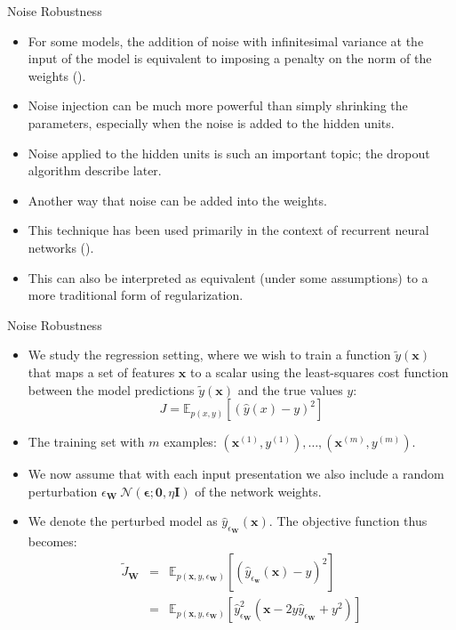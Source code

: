 \documentclass[10pt]{beamer}
\begin{document}
	\begin{frame}{Noise Robustness}
		\begin{itemize}
			\item For some models, the addition of noise with infinitesimal variance at the input of the model is equivalent to imposing a penalty on the norm of the weights (\citet{bishop1995regularization,bishop1995training}).
			\pause
			\item Noise injection can be much more powerful than simply shrinking the parameters, especially when the noise is added to the hidden units.
			\pause
			\item Noise applied to the hidden units is such an important topic; the dropout algorithm describe later.
			\pause
			\item Another way that noise can be added into the weights.
			\pause
			\item This technique has been used primarily in the context of recurrent neural networks (\citet{jim1996analysis,graves2011practical}).
			\pause
			\item This can also be interpreted as equivalent (under some assumptions) to a more traditional form of regularization.
		\end{itemize}
	\end{frame}

	\begin{frame}{Noise Robustness}
		\begin{itemize}
			\item We study the regression setting, where we wish to train a function $\tilde{y}(\bm{x})$ that maps a set of features $\bm{x}$ to a scalar using the least-squares cost function between the model predictions $\tilde{y}(\bm{x})$ and the true values $y$:
			$$J=\mathbb{E}_{p(x,y)}\left[(\hat{y}(x)-y)^2\right]$$
			
			\pause
			\item The training set with $m$ examples: ${(\bm{x}^{(1)},y^{(1)}),\dots,(\bm{x}^{(m)},y^{(m)})}$.
			\pause
			\item We now assume that with each input presentation we also include a random perturbation $\epsilon_{\bm{W}}~\mathcal{N}(\bm{\epsilon};\bm{0},\eta\bm{I})$ of the network weights.
			\pause
			\item We denote the perturbed model as $\hat{y}_{\epsilon_{\bm{W}}}(\bm{x})$. The objective function thus becomes:
			\begin{eqnarray*}
				\tilde{J}_{\bm{W}}&=&\mathbb{E}_{p(\bm{x},y,\epsilon_{\bm{W}})}\left[(\hat{y}_{\epsilon_{\bm{w}}}(\bm{x})-y)^2\right]\\
				&=&\mathbb{E}_{p(\bm{x},y,\epsilon_{\bm{W}})}\left[\hat{y}^2_{\epsilon_{\bm{W}}}(\bm{x}-2y\hat{y}_{\epsilon_{\bm{W}}}+y^2)\right]
			\end{eqnarray*}
		\end{itemize}
	\end{frame}
\end{document}
